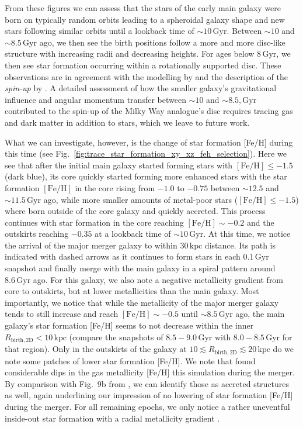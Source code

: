 \documentclass[fleqn,usenatbib]{mnras}
\begin{document}
From these figures we can assess that the stars of the early main galaxy were born on typically random orbits leading to a spheroidal galaxy shape and new stars following similar orbits until a lookback time of $\sim 10\,\mathrm{Gyr}$. Between $\sim10$ and $\sim 8.5\,\mathrm{Gyr}$ ago, we then see the birth positions follow a more and more disc-like structure with increasing radii and decreasing heights. For ages below $8\,\mathrm{Gyr}$, we then see star formation occurring within a rotationally supported disc. These observations are in agreement with the modelling by \citet{MCM2013} and the description of the \textit{spin-up} by \citet{Belokurov2022}. A detailed assessment of how the smaller galaxy’s gravitational influence and angular momentum transfer between $\sim10$ and $\sim8.5,\mathrm{Gyr}$ contributed to the spin-up of the Milky Way analogue’s disc requires tracing gas and dark matter in addition to stars, which we leave to future work.

What we can investigate, however, is the change of star formation [Fe/H] during this time (see Fig.~\ref{fig:trace_star_formation_xy_xz_feh_selection}). Here we see that after the initial main galaxy started forming stars with $\mathrm{[Fe/H]} \leq -1.5$ (dark blue), its core quickly started forming more enhanced stars with the star formation $\mathrm{[Fe/H]}$ in the core rising from $-1.0$ to $-0.75$ between $\sim 12.5$ and $\sim11.5\,\mathrm{Gyr}$ ago, while more smaller amounts of metal-poor stars ($\mathrm{[Fe/H]} \leq -1.5$) where born outside of the core galaxy and quickly accreted. This process continues with star formation in the core reaching $\mathrm{[Fe/H]} \sim -0.2$ and the outskirts reaching $-0.35$ at a lookback time of $\sim 10\,\mathrm{Gyr}$. At this time, we notice the arrival of the major merger galaxy to within $30\,\mathrm{kpc}$ distance. Its path is indicated with dashed arrows as it continues to form stars in each $0.1\,\mathrm{Gyr}$ snapshot and finally merge with the main galaxy in a spiral pattern around $8.6\,\mathrm{Gyr}$ ago. For this galaxy, we also note a negative metallicity gradient from core to outskirts, but at lower metallicities than the main galaxy. Most importantly, we notice that while the metallicity of the major merger galaxy tends to still increase and reach $\mathrm{[Fe/H]} \sim -0.5$ until $\sim 8.5\,\mathrm{Gyr}$ ago, the main galaxy's star formation [Fe/H] seems to not decrease within the inner $R_\mathrm{birth,2D} < 10\,\mathrm{kpc}$ (compare the snapshots of $8.5-9.0\,\mathrm{Gyr}$ with $8.0-8.5\,\mathrm{Gyr}$ for that region). Only in the outskirts of the galaxy at $10 \lesssim R_\mathrm{birth, 2D} \lesssim 20\,\mathrm{kpc}$ do we note some patches of lower star formation [Fe/H]. We note that \citet{Buck2023} found considerable dips in the gas metallicity [Fe/H] this simulation during the merger. By comparison with Fig.~9b from , we can identify those as accreted structures as well, again underlining our impression of no lowering of star formation [Fe/H] during the merger. For all remaining epochs, we only notice a rather uneventful inside-out star formation with a radial metallicity gradient \citep[see also][]{Buder2025}.
\end{document}
